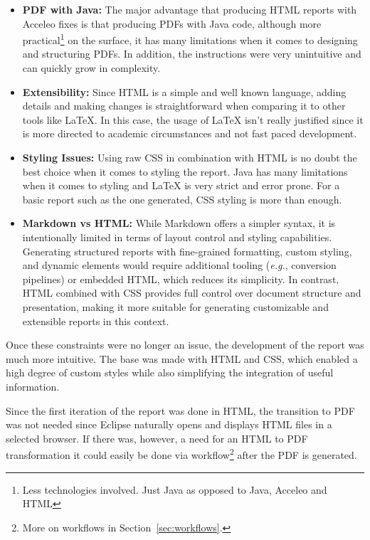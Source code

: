 \begin{itemize} 
	\item \textbf{PDF with Java:} The major advantage that producing \gls{HTML} reports with Acceleo fixes is that producing PDFs with Java code, although more practical\footnote{Less technologies involved. Just Java as opposed to Java, Acceleo and \gls{HTML}} on the surface, it has many limitations when it comes to designing and structuring PDFs. In addition, the instructions were very unintuitive and can quickly grow in complexity.
	\item \textbf{Extensibility:} Since \gls{HTML} is a simple and well known language, adding details and making changes is straightforward when comparing it to other tools like LaTeX. In this case, the usage of LaTeX isn't really justified since it is more directed to academic circumstances and not fast paced development. 
	\item \textbf{Styling Issues:} Using raw \gls{CSS} in combination with \gls{HTML} is no doubt the best choice when it comes to styling the report. Java has many limitations when it comes to styling and LaTeX is very strict and error prone. For a basic report such as the one generated, \gls{CSS} styling is more than enough.
	\item \textbf{ Markdown vs HTML:} While Markdown offers a simpler syntax, it is intentionally limited in terms of layout control and styling capabilities. Generating structured reports with fine-grained formatting, custom styling, and dynamic elements would require additional tooling (\textit{e.g.}, conversion pipelines) or embedded \gls{HTML}, which reduces its simplicity. In contrast, \gls{HTML} combined with \gls{CSS} provides full control over document structure and presentation, making it more suitable for generating customizable and extensible reports in this context.
\end{itemize}

Once these constraints were no longer an issue, the development of the report was much more intuitive. The base was made with \gls{HTML} and \gls{CSS}, which enabled a high degree of custom styles while also simplifying the integration of useful information. 

Since the first iteration of the report was done in \gls{HTML}, the transition to PDF was not needed since Eclipse naturally opens and displays \gls{HTML} files in a selected browser. If there was, however, a need for an \gls{HTML} to PDF transformation it could easily be done via workflow\footnote{More on workflows in Section~\ref{sec:workflows}.} after the PDF is generated.

